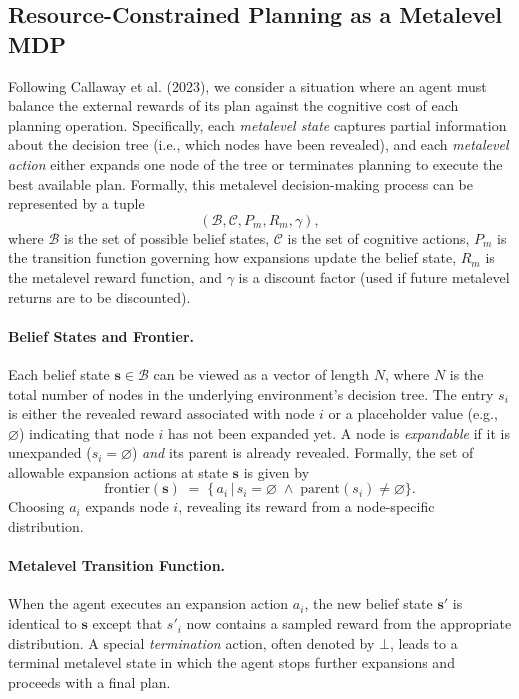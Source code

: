 \documentclass[a4paper,12pt,oneside,article]{memoir}
\begin{document}
\subsection*{Resource-Constrained Planning as a Metalevel MDP}
Following Callaway et al. (2023), we consider a situation where an agent must balance the external rewards of its plan against the cognitive cost of each planning operation. Specifically, each \emph{metalevel state} captures partial information about the decision tree (i.e., which nodes have been revealed), and each \emph{metalevel action} either expands one node of the tree or terminates planning to execute the best available plan. Formally, this metalevel decision-making process can be represented by a tuple
\[
(\mathcal{B}, \mathcal{C}, P_m, R_m, \gamma),
\]
where $\mathcal{B}$ is the set of possible belief states, $\mathcal{C}$ is the set of cognitive actions, $P_m$ is the transition function governing how expansions update the belief state, $R_m$ is the metalevel reward function, and $\gamma$ is a discount factor (used if future metalevel returns are to be discounted).

\paragraph{Belief States and Frontier.}
Each belief state $\mathbf{s} \in \mathcal{B}$ can be viewed as a vector of length $N$, where $N$ is the total number of nodes in the underlying environment’s decision tree. The entry $s_i$ is either the revealed reward associated with node $i$ or a placeholder value (e.g., $\varnothing$) indicating that node $i$ has not been expanded yet.  
A node is \emph{expandable} if it is unexpanded ($s_i = \varnothing$) \emph{and} its parent is already revealed. Formally, the set of allowable expansion actions at state $\mathbf{s}$ is given by
\begin{equation}
    \mathrm{frontier}(\mathbf{s}) \;=\;
    \bigl\{\, a_i \,\big|\,
    s_i = \varnothing \;\wedge\; \mathrm{parent}(s_i)\neq \varnothing 
    \bigr\}.
    \label{eq:frontier_rewrite}
\end{equation}
Choosing $a_i$ expands node $i$, revealing its reward from a node-specific distribution.

\paragraph{Metalevel Transition Function.}
When the agent executes an expansion action $a_i$, the new belief state $\mathbf{s}'$ is identical to $\mathbf{s}$ except that $s'_i$ now contains a sampled reward from the appropriate distribution. A special \emph{termination} action, often denoted by $\bot$, leads to a terminal metalevel state in which the agent stops further expansions and proceeds with a final plan.
\end{document}
